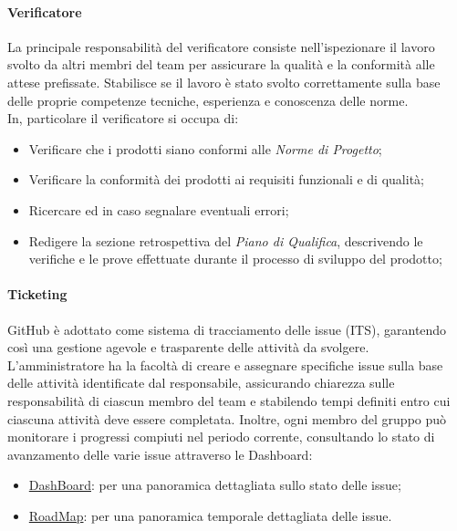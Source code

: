 \paragraph{Verificatore}\label{verificatore} La principale responsabilità del verificatore consiste nell'ispezionare il lavoro svolto da altri membri del team per assicurare la qualità e la conformità alle attese prefissate.
Stabilisce se il lavoro è stato svolto correttamente sulla base delle proprie competenze tecniche, esperienza e conoscenza delle norme. \\
In, particolare il verificatore si occupa di:
\begin{itemize}
    \item Verificare che i prodotti siano conformi alle \textit{Norme di Progetto};
    \item Verificare la conformità dei prodotti ai requisiti funzionali e di qualità;
    \item Ricercare ed in caso segnalare eventuali errori;
    \item Redigere la sezione retrospettiva del \textit{Piano di Qualifica}, descrivendo le verifiche e le prove effettuate durante il processo di sviluppo del prodotto;
\end{itemize}

\hypertarget{par:ticketing}{\paragraph{Ticketing}}
GitHub è adottato come sistema di tracciamento delle issue (ITS), garantendo così una gestione agevole e trasparente delle attività da svolgere. \\
L'amministratore ha la facoltà di creare e assegnare specifiche issue sulla base delle attività identificate dal responsabile, assicurando chiarezza sulle responsabilità di ciascun membro del team e stabilendo tempi definiti entro cui ciascuna attività deve essere completata. Inoltre, ogni membro del gruppo può monitorare i progressi compiuti nel periodo corrente, consultando lo stato di avanzamento delle varie issue attraverso le Dashboard:
\begin{itemize}
    \item \href{https://github.com/orgs/ByteOps-swe/projects/1}{DashBoard}: per una panoramica dettagliata sullo stato delle issue;
    \item \href{https://github.com/orgs/ByteOps-swe/projects/3}{RoadMap}: per una panoramica temporale dettagliata delle issue.
\end{itemize}

